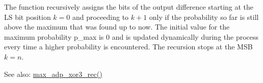 \-The function recursively assigns the bits of the output difference starting at the \-L\-S bit position $k = 0$ and proceeding to $k+1$ only if the probability so far is still above the maximum that was found up to now. \-The initial value for the maximum probability {\ttfamily p\-\_\-max} is 0 and is updated dynamically during the process every time a higher probability is encountered. \-The recursion stops at the \-M\-S\-B $k = n$.

\-See also\-: \hyperlink{max-adp-xor3_8cc_ad2234c23808b10a3c3b64962c4d24198}{max\-\_\-adp\-\_\-xor3\-\_\-rec()} 